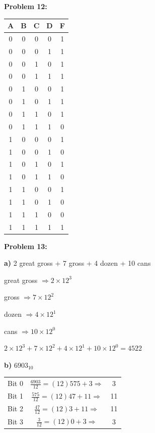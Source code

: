 \documentclass{article}
\begin{document}
    \textbf{Problem 12:}

    \begin{center}
        \begin{tabular}{ c|c|c|c|c }
            A & B & C & D & F \\
            \hline
            0 & 0 & 0 & 0 & 1 \\
            0 & 0 & 0 & 1 & 1 \\
            0 & 0 & 1 & 0 & 1 \\
            0 & 0 & 1 & 1 & 1 \\
            0 & 1 & 0 & 0 & 1 \\
            0 & 1 & 0 & 1 & 1 \\
            0 & 1 & 1 & 0 & 1 \\
            0 & 1 & 1 & 1 & 0 \\
            1 & 0 & 0 & 0 & 1 \\
            1 & 0 & 0 & 1 & 0 \\
            1 & 0 & 1 & 0 & 1 \\
            1 & 0 & 1 & 1 & 0 \\
            1 & 1 & 0 & 0 & 1 \\
            1 & 1 & 0 & 1 & 0 \\
            1 & 1 & 1 & 0 & 0 \\
            1 & 1 & 1 & 1 & 1
            
        \end{tabular}
    \end{center}

    \textbf{Problem 13:}

    \quad\textbf{a)} 2 great gross + 7 gross + 4 dozen + 10 cans

    \quad{} great gross $\Rightarrow 2 \times 12^3$ 

    \quad{} gross $\Rightarrow 7 \times 12^2$ 

    \quad{} dozen $\Rightarrow 4 \times 12^1$ 

    \quad{} cans $\Rightarrow 10 \times 12^0$ 

    \quad\quad $2\times 12^3 + 7 \times 12^2 + 4 \times 12^1 + 10 \times 12^0=\boxed{4522}$

    \quad\textbf{b)} $6903_{10}$

    \begin{center}
        \begin{tabular}{ c|c c }
            Bit 0 & $\frac{6903}{12} = (12)575 + 3 \Rightarrow$ & 3 \\
            Bit 1 & $\frac{575}{12} = (12)47 + 11 \Rightarrow$ & 11 \\
            Bit 2 & $\frac{47}{12} = (12)3 + 11 \Rightarrow$ & 11 \\
            Bit 3 & $\frac{3}{12} = (12)0 + 3 \Rightarrow$ & 3 \\
        \end{tabular}
    \end{center}
\end{document}

